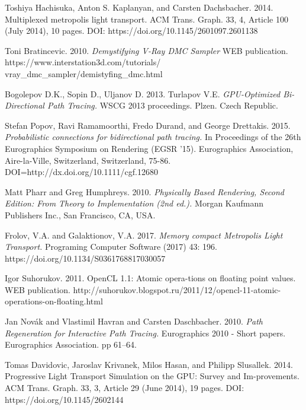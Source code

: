 \documentclass[twoside,twocolumn,10pt]{article}
\begin{document}
\begin{thebibliography}{99}
 Toshiya Hachisuka, Anton S. Kaplanyan, and Carsten Dachsbacher. 2014. Multiplexed metropolis light transport. ACM Trans. Graph. 33, 4, Article 100 (July 2014), 10 pages. DOI: https://doi.org/10.1145/2601097.2601138 

 Toni Bratincevic. 2010. \textit{Demystifying V-Ray DMC Sampler} WEB publication. https://www.interstation3d.com/tutorials/ \newline vray\_dmc\_sampler/demistyfing\_dmc.html


 Bogolepov D.K., Sopin D., Uljanov D. 2013. Turlapov V.E. \textit{GPU-Optimized Bi-Directional Path Tracing.} WSCG 2013 proceedings. Plzen. Czech Republic.

 Stefan Popov, Ravi Ramamoorthi, Fredo Durand, and George Drettakis. 2015. \textit{Probabilistic connections for bidirectional path tracing.} In Proceedings of the 26th Eurographics Symposium on Rendering (EGSR '15). Eurographics Association, Aire-la-Ville, Switzerland, Switzerland, 75-86. DOI=http://dx.doi.org/10.1111/cgf.12680 

 Matt Pharr and Greg Humphreys. 2010. \textit{Physically Based Rendering, Second Edition: From Theory to Implementation (2nd ed.).} Morgan Kaufmann Publishers Inc., San Francisco, CA, USA.

 Frolov, V.A. and Galaktionov, V.A. 2017. \textit{Memory compact Metropolis Light Transport.} Programing Computer Software (2017) 43: 196. https://doi.org/10.1134/S0361768817030057

 Igor Suhorukov. 2011. OpenCL 1.1: Atomic opera-tions on floating point values. WEB publication. http://suhorukov.blogspot.ru/2011/12/opencl-11-atomic-operations-on-floating.html


 Jan Nov\'{a}k and Vlastimil Havran and Carsten Daschbacher. 2010. \textit{Path Regeneration for Interactive Path Tracing.} Eurographics 2010 - Short papers. Eurographics Association. pp 61--64.

 Tomas Davidovic, Jaroslav Krivanek, Milos Hasan, and Philipp Slusallek. 2014. Progressive Light Transport Simulation on the GPU: Survey and Im-provements. ACM Trans. Graph. 33, 3, Article 29 (June 2014), 19 pages. DOI: https://doi.org/10.1145/2602144


\end{thebibliography}
\end{document}
